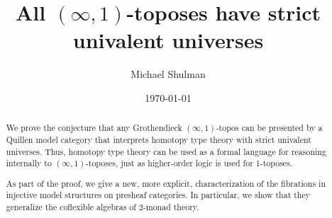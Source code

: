 \documentclass{amsart}
\title{All $(\infty,1)$-toposes have strict univalent universes}
\author{Michael Shulman}
\date{\today}
\def\io{\ensuremath{(\infty,1)}}
\begin{document}
\maketitle

\begin{abstract}
  We prove the conjecture that any Grothendieck \io-topos can be presented by a Quillen model category that interprets homotopy type theory with strict univalent universes.
  Thus, homotopy type theory can be used as a formal language for reasoning internally to \io-toposes, just as higher-order logic is used for 1-toposes.

  As part of the proof, we give a new, more explicit, characterization of the fibrations in injective model structures on presheaf categories.
  In particular, we show that they generalize the coflexible algebras of 2-monad theory.
\end{abstract}

\DeclareRobustCommand{\gobblefive}[5]{}
\newcommand*{\skiptoc}{\addtocontents{toc}{\gobblefive}}
\setcounter{tocdepth}{1}
\tableofcontents



















\appendix





\end{document}
